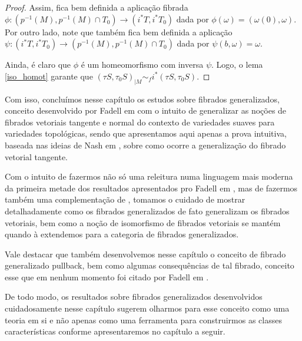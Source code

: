\documentclass[12pt,oneside]{book} %
\begin{document}
\begin{proof}
	\par Assim, fica bem definida a aplicação fibrada $\phi:(p^{-1}(M),p^{-1}(M)\cap T_{0})\to (i^{*}T,i^{*}T_{0})$ dada por $\phi(\omega)=(\omega(0),\omega)$.
	Por outro lado, note que também fica bem definida a aplicação $\psi:(i^{*}T,i^{*}T_{0})\to (p^{-1}(M),p^{-1}(M)\cap T_{0})$ dada por $\psi(b,\omega)=\omega$.
	
	\par Ainda, é claro que $\phi$ é um homeomorfismo com inversa $\psi$. Logo, o lema \ref{iso_homot} garante que $(\tau S,\tau_{0}S)_{|M}\sim_{f} i^{*}(\tau S,\tau_{0}S)$.
	
\end{proof}

\par Com isso, concluímos nesse capítulo os estudos sobre fibrados generalizados, conceito desenvolvido por Fadell em \cite{fadell_1} com o intuito de generalizar as noções de fibrados vetoriais tangente e normal do contexto de variedades suaves para variedades topológicas, sendo que apresentamos aqui apenas a prova intuitiva, baseada nas ideias de Nash em \cite{nash}, sobre como ocorre a generalização do fibrado vetorial tangente.

\par Com o intuito de fazermos não só uma releitura numa linguagem mais moderna da primeira metade dos resultados apresentados pro Fadell em \cite{fadell_1}, mas de fazermos também uma complementação de \cite{fadell_1}, tomamos o cuidado de mostrar detalhadamente como os fibrados generalizados de fato generalizam os fibrados vetoriais, bem como a noção de isomorfismo de fibrados vetoriais se mantém quando à extendemos para a categoria de fibrados generalizados.

\par Vale destacar que também desenvolvemos nesse capítulo o conceito de fibrado generalizado pullback, bem como algumas consequências de tal fibrado, conceito esse que em nenhum momento foi citado por Fadell em \cite{fadell_1}.

\par De todo modo, os resultados sobre fibrados generalizados desenvolvidos cuidadosamente nesse capítulo sugerem olharmos para esse conceito como uma teoria em si e não apenas como uma ferramenta para construirmos as classes características conforme apresentaremos no capítulo a seguir.
\end{document}
